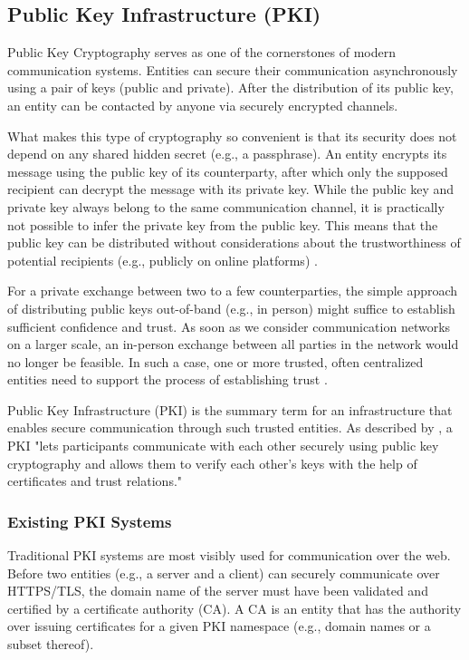 \subsection{Public Key Infrastructure (PKI)}
\label{subsec:03_pki}

Public Key Cryptography serves as one of the cornerstones of modern communication systems. Entities can secure their communication asynchronously using a pair of keys (public and private). After the distribution of its public key, an entity can be contacted by anyone via securely encrypted channels.

What makes this type of cryptography so convenient is that its security does not depend on any shared hidden secret (e.g., a passphrase). An entity encrypts its message using the public key of its counterparty, after which only the supposed recipient can decrypt the message with its private key. While the public key and private key always belong to the same communication channel, it is practically not possible to infer the private key from the public key. This means that the public key can be distributed without considerations about the trustworthiness of potential recipients (e.g., publicly on online platforms) \cite{straub_tobias_usability_2006}.

For a private exchange between two to a few counterparties, the simple approach of distributing public keys out-of-band (e.g., in person) might suffice to establish sufficient confidence and trust. As soon as we consider communication networks on a larger scale, an in-person exchange between all parties in the network would no longer be feasible. In such a case, one or more trusted, often centralized entities need to support the process of establishing trust \cite{straub_tobias_usability_2006}.

Public Key Infrastructure (PKI) is the summary term for an infrastructure that enables secure communication through such trusted entities. As described by \citeauthor{straub_tobias_usability_2006}, a PKI "lets participants communicate with each other securely using public key cryptography and allows them to verify each other's keys with the help of certificates and trust relations."


\subsubsection{Existing PKI Systems}

Traditional PKI systems are most visibly used for communication over the web. Before two entities (e.g., a server and a client) can securely communicate over HTTPS/TLS, the domain name of the server must have been validated and certified by a certificate authority (CA). A CA is an entity that has the authority over issuing certificates for a given PKI namespace (e.g., domain names or a subset thereof).

